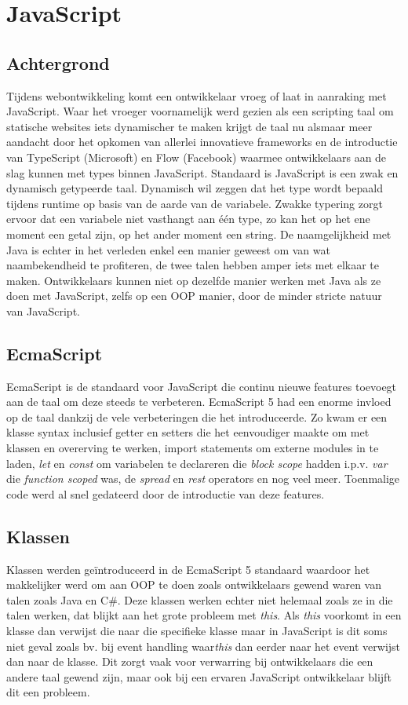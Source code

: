 \section{JavaScript}
\subsection{Achtergrond}
Tijdens webontwikkeling komt een ontwikkelaar vroeg of laat in aanraking met JavaScript. Waar het vroeger voornamelijk werd gezien als een scripting taal om statische websites iets dynamischer te maken krijgt de taal nu alsmaar meer aandacht door het opkomen van allerlei innovatieve frameworks en de introductie van TypeScript (Microsoft) en Flow (Facebook) waarmee ontwikkelaars aan de slag kunnen met types binnen JavaScript. Standaard is JavaScript is een zwak en dynamisch getypeerde taal. Dynamisch wil zeggen dat het type wordt bepaald tijdens runtime op basis van de aarde van de variabele. Zwakke typering zorgt ervoor dat een variabele niet vasthangt aan één type, zo kan het op het ene moment een getal zijn, op het ander moment een string. De naamgelijkheid met Java is echter in het verleden enkel een manier geweest om van wat naambekendheid te profiteren, de twee talen hebben amper iets met elkaar te maken. Ontwikkelaars kunnen niet op dezelfde manier werken met Java als ze doen met JavaScript, zelfs op een OOP manier, door de minder stricte natuur van JavaScript. 

\subsection{EcmaScript}
EcmaScript is de standaard voor JavaScript die continu nieuwe features toevoegt aan de taal om deze steeds te verbeteren. EcmaScript 5 had een enorme invloed op de taal dankzij de vele verbeteringen die het introduceerde. Zo kwam er een klasse syntax inclusief getter en setters die het eenvoudiger maakte om met klassen en overerving te werken, import statements om externe modules in te laden, \textit{let} en \textit{const} om variabelen te declareren die \textit{block scope} hadden i.p.v. \textit{var} die \textit{function scoped} was, de \textit{spread} en \textit{rest} operators en nog veel meer. Toenmalige code werd al snel gedateerd door de introductie van deze features.

\subsection{Klassen}
Klassen werden geïntroduceerd in de EcmaScript 5 standaard waardoor het makkelijker werd om aan OOP te doen zoals ontwikkelaars gewend waren van talen zoals Java en C\#. Deze klassen werken echter niet helemaal zoals ze in die talen werken, dat blijkt aan het grote probleem met \textit{this}. Als \textit{this} voorkomt in een klasse dan verwijst die naar die specifieke klasse maar in JavaScript is dit soms niet geval zoals bv. bij event handling waar\textit{this} dan eerder naar het event verwijst dan naar de klasse. Dit zorgt vaak voor verwarring bij ontwikkelaars die een andere taal gewend zijn, maar ook bij een ervaren JavaScript ontwikkelaar blijft dit een probleem.

